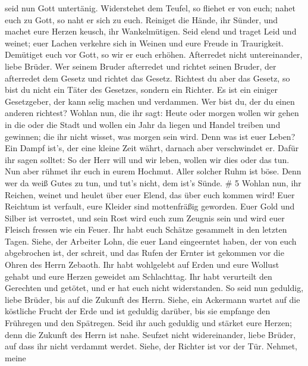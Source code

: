 seid nun Gott untertänig. Widerstehet dem Teufel, so fliehet er von
euch;  nahet euch zu Gott, so naht er sich zu euch. Reiniget
die Hände, ihr Sünder, und machet eure Herzen keusch, ihr Wankelmütigen.
 Seid elend und traget Leid und weinet; euer Lachen verkehre
sich in Weinen und eure Freude in Traurigkeit.  Demütiget
euch vor Gott, so wir er euch erhöhen.  Afterredet nicht
untereinander, liebe Brüder. Wer seinem Bruder afterredet und richtet
seinen Bruder, der afterredet dem Gesetz und richtet das Gesetz.
Richtest du aber das Gesetz, so bist du nicht ein Täter des Gesetzes,
sondern ein Richter.  Es ist ein einiger Gesetzgeber, der
kann selig machen und verdammen. Wer bist du, der du einen anderen
richtest?  Wohlan nun, die ihr sagt: Heute oder morgen
wollen wir gehen in die oder die Stadt und wollen ein Jahr da liegen und
Handel treiben und gewinnen;  die ihr nicht wisset, was
morgen sein wird. Denn was ist euer Leben? Ein Dampf ist's, der eine
kleine Zeit währt, darnach aber verschwindet er.  Dafür ihr
sagen solltet: So der Herr will und wir leben, wollen wir dies oder das
tun.  Nun aber rühmet ihr euch in eurem Hochmut. Aller
solcher Ruhm ist böse.  Denn wer da weiß Gutes zu tun, und
tut's nicht, dem ist's Sünde. \# 5  Wohlan nun, ihr Reichen,
weinet und heulet über euer Elend, das über euch kommen wird!
 Euer Reichtum ist verfault, eure Kleider sind mottenfräßig
geworden.  Euer Gold und Silber ist verrostet, und sein Rost
wird euch zum Zeugnis sein und wird euer Fleisch fressen wie ein Feuer.
Ihr habt euch Schätze gesammelt in den letzten Tagen. 
Siehe, der Arbeiter Lohn, die euer Land eingeerntet haben, der von euch
abgebrochen ist, der schreit, und das Rufen der Ernter ist gekommen vor
die Ohren des Herrn Zebaoth.  Ihr habt wohlgelebt auf Erden
und eure Wollust gehabt und eure Herzen geweidet am Schlachttag.
 Ihr habt verurteilt den Gerechten und getötet, und er hat
euch nicht widerstanden.  So seid nun geduldig, liebe
Brüder, bis auf die Zukunft des Herrn. Siehe, ein Ackermann wartet auf
die köstliche Frucht der Erde und ist geduldig darüber, bis sie empfange
den Frühregen und den Spätregen.  Seid ihr auch geduldig und
stärket eure Herzen; denn die Zukunft des Herrn ist nahe. 
Seufzet nicht widereinander, liebe Brüder, auf dass ihr nicht verdammt
werdet. Siehe, der Richter ist vor der Tür.  Nehmet, meine
